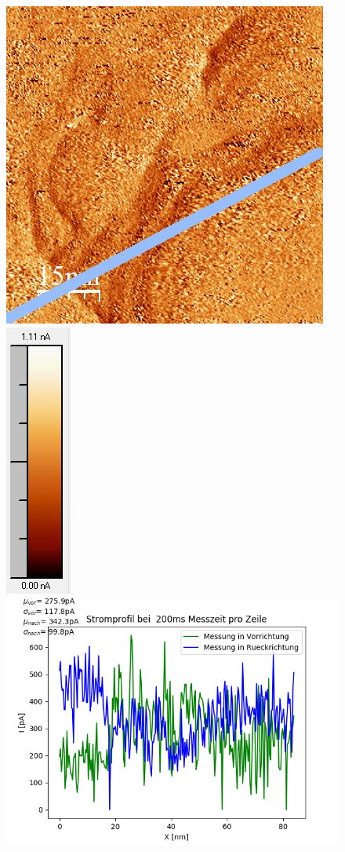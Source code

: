 \documentclass[12pt,a4paper]{article}
\begin{document}
\begin{figure}[H]
\includegraphics[scale=0.6]{Bilder/Anhang/Zeit/Strom/0_2_Zeit_nach_Strom.jpg}
\includegraphics[scale=0.6]{Bilder/Anhang/Zeit/Strom/0_2_Zeit_nach_Strom_Skala.jpg}
\includegraphics[scale=0.5]{Bilder/Anhang/Zeit/Strom/Strom_Profil_Zeit_0200.png}

\end{figure}
\end{document}
